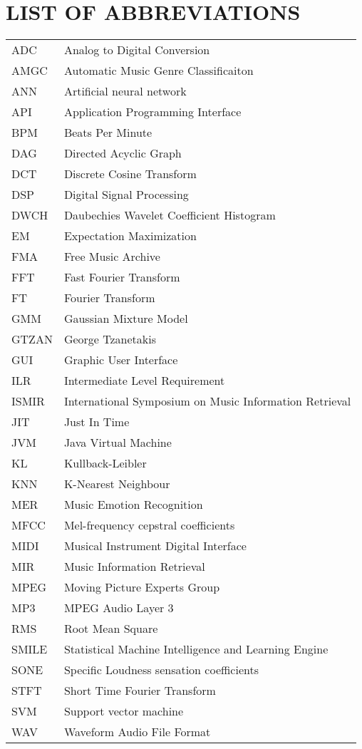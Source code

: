 \newpage
\section*{\fontsize{14pt}{0pt}\bfseries LIST OF ABBREVIATIONS}
\begin{longtable}[l]{p{50pt} p{200pt}}
        ADC & Analog to Digital Conversion\\
        AMGC & Automatic Music Genre Classificaiton\\
        ANN & Artificial neural network\\
        API & Application Programming Interface\\
        BPM & Beats Per Minute\\
        DAG & Directed Acyclic Graph\\
        DCT & Discrete Cosine Transform\\
        DSP & Digital Signal Processing\\
        DWCH & Daubechies Wavelet Coefficient Histogram\\
        EM & Expectation Maximization\\
        FMA & Free Music Archive\\
        FFT & Fast Fourier Transform\\
        FT & Fourier Transform\\
        GMM & Gaussian Mixture Model\\
        GTZAN & George Tzanetakis\\
        GUI & Graphic User Interface\\
        ILR & Intermediate Level Requirement\\
        ISMIR & International Symposium on Music Information Retrieval\\
        JIT & Just In Time\\
        JVM & Java Virtual Machine\\
        KL & Kullback-Leibler\\
        KNN & K-Nearest Neighbour\\
        MER & Music Emotion Recognition\\
        MFCC & Mel-frequency cepstral coefficients\\
        MIDI & Musical Instrument Digital Interface\\
        MIR & Music Information Retrieval  \\
        MPEG & Moving Picture Experts Group\\
        MP3 & MPEG Audio Layer 3\\
        RMS & Root Mean Square\\
        SMILE & Statistical Machine Intelligence and Learning Engine\\
        SONE & Specific Loudness sensation coefficients\\
        STFT & Short Time Fourier Transform\\
        SVM & Support vector machine\\
        WAV & Waveform Audio File Format\\

\end{longtable}

